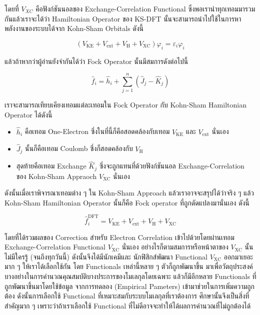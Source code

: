 \noindent โดยที่ $V_{X C}$ คือฟังก์ชันนอลของ Exchange-Correlation Functional ซึ่งพอเรานำทุกเทอมมารวมกันแล้วเราจะได้ว่า
Hamiltonian Operator ของ KS-DFT นั้นจะสามารถนำไปใช้ในการหาพลังงานของระบบได้จาก Kohn-Sham Orbitals ดังนี้

\begin{equation}
  \label{eq:Kohn_Sham_Equation}
  \left(
  V_{\mathrm{KE}}
  + V_{\mathrm{ext}}
  + V_{\mathrm{H}}
  + V_{\mathrm{XC}}
  \right)
  \varphi_i
  =
  \varepsilon_i \varphi_i
\end{equation}

\noindent แล้วถ้าหากว่าผู้อ่านยังจำกันได้ว่า Fock Operator นั้นมีสมการดังต่อไปนี้

\begin{equation}
  \hat{f}_i
  =
  \hat{h}_i + \sum_{j=1}^n \left(\hat{J}_j - \hat{K}_j\right)
\end{equation}

\noindent เราจะสามารถเทียบเคียงเทอมแต่ละเทอมใน Fock Operator กับ Kohn-Sham Hamiltonian Operator ได้ดังนี้

\begin{itemize}[topsep=0pt,noitemsep]
  \setlength\itemsep{1em}
  \item $\hat{h}_i$ คือเทอม One-Electron ซึ่งในที่นี้ก็คือสอดคล้องกับเทอม $V_{\mathrm{KE}}$ และ $V_{\mathrm{ext}}$ นั่นเอง

  \item $\hat{J}_j$ นั้นก็คือเทอม Coulomb ซึ่งก็สอดคล้องกับ $V_{\mathrm{H}}$

  \item สุดท้ายคือเทอม Exchange $\hat{K}_j$ ซึ่งจะถูกแทนที่ด้วยฟังก์ชันนอล Exchange-Correlation ของ Kohn-Sham Appraoch
        $V_{\mathrm{XC}}$ นั่นเอง
\end{itemize}

ดังนั้นเมื่อเราพิจารณาเทอมต่าง ๆ ใน Kohn-Sham Approach แล้วเราอาจจะสรุปได้ว่าจริง ๆ แล้ว Kohn-Sham Hamiltonian Operator นั้นก็คือ
Fock operator ที่ถูกดัดแปลงมานั่นเอง ดังนี้

\begin{equation}
  \hat{f}_i^{\mathrm{DFT}}
  =
  V_{\mathrm{KE}}
  + V_{\mathrm{ext}}
  + V_{\mathrm{H}}
  + V_{\mathrm{XC}}
\end{equation}

\noindent โดยที่ได้รวมผลของ Correction สำหรับ Electron Correlation เข้าไปด้วยโดยผ่านเทอม Exchange-Correlation Functional
$V_{\mathrm{XC}}$ นั่นเอง อย่างไรก็ตามสมการหรือหน้าตาของ $V_{\mathrm{XC}}$ นั้นไม่มีใครรู้ (จนถึงทุกวันนี้) ดังนั้นจึงได้มีนักเคมีและ%
นักฟิสิกส์พัฒนา Functional $V_{\mathrm{XC}}$ ออกมาเยอะมาก ๆ ให้เราได้เลือกใช้กัน โดย Functionals เหล่านี้หลาย ๆ ตัวก็ถูกพัฒนาขึ้น%
มาเพื่อวัตถุประสงค์บางอย่างในการคำนวณคุณสมบัติบางประการของโมเลกุลโดยเฉพาะ แล้วก็มีอีกหลาย Functionals ที่ถูกพัฒนาขึ้นมาโดยใช้ข้อมูล%
จากการทดลอง (Empirical Pameters) เข้ามาช่วยในการเพิ่มความถูกต้อง ดังนั้นการเลือกใช้ Functional ที่เหมาะสมกับระบบโมเลกุลที่เราต้องการ%
ศึกษานั้นจึงเป็นสิ่งที่สำคัญมาก ๆ เพราะว่าถ้าเราเลือกใช้ Functional ที่ไม่ดีอาจจะทำให้ได้ผลการคำนวณที่ไม่ถูกต้องได้

